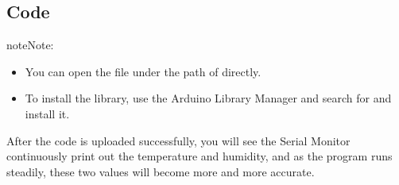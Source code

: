 \documentclass[a4paper,11pt,english]{sphinxmanual}
\begin{document}
\subsection{Code}
\label{\detokenize{Basic_Project/DHT11_Module:code}}
\begin{sphinxadmonition}{note}{Note:}\begin{itemize}
\item {} 
\sphinxAtStartPar
You can open the file  under the path of  directly.

\item {} 
\sphinxAtStartPar
To install the library, use the Arduino Library Manager and search for  and install it.

\end{itemize}
\end{sphinxadmonition}

\sphinxAtStartPar
After the code is uploaded successfully, you will see the Serial Monitor continuously print out the temperature and humidity, and as the program runs steadily, these two values will become more and more accurate.
\end{document}
